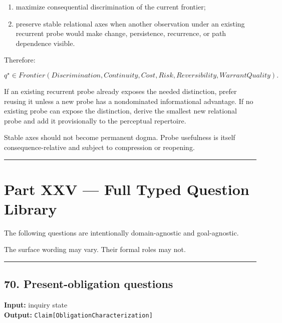 \documentclass[
]{article}
\providecommand{\tightlist}{%
  \setlength{\itemsep}{0pt}\setlength{\parskip}{0pt}}
\begin{document}
\begin{enumerate}
\def\labelenumi{\arabic{enumi}.}
\tightlist
\item maximize consequential discrimination of the current frontier;
\item preserve stable relational axes when another observation under an existing
  recurrent probe would make change, persistence, recurrence, or path dependence
  visible.
\end{enumerate}

Therefore:

\[
\boxed{
q^\star
\in
Frontier(
Discrimination,
Continuity,
Cost,
Risk,
Reversibility,
WarrantQuality
).
}
\]

If an existing recurrent probe already exposes the needed distinction, prefer
reusing it unless a new probe has a nondominated informational advantage. If no
existing probe can expose the distinction, derive the smallest new relational
probe and add it provisionally to the perceptual repertoire.

Stable axes should not become permanent dogma. Probe usefulness is itself
consequence-relative and subject to compression or reopening.

\begin{center}\rule{0.5\linewidth}{0.5pt}\end{center}

\section{Part XXV --- Full Typed Question
Library}\label{part-xxv-full-typed-question-library}

The following questions are intentionally domain-agnostic and
goal-agnostic.

The surface wording may vary. Their formal roles may not.

\begin{center}\rule{0.5\linewidth}{0.5pt}\end{center}

\subsection{70. Present-obligation
questions}\label{present-obligation-questions}

\textbf{Input:} inquiry state\\
\textbf{Output:} \texttt{Claim{[}ObligationCharacterization{]}}
\end{document}
